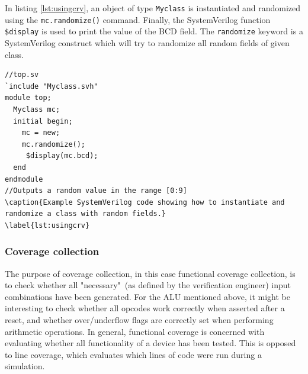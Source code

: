 \documentclass[conference]{IEEEtran}
\newcommand{\SV}{SystemVerilog\xspace}
\newcommand{\longlist}[3]{{}}
\begin{document}
\longlist{snippets/Myclass.svh}{Example SystemVerilog code showing how different values are constrained.}{lst:crvlst}


In listing \ref{lst:usingcrv}, an object of type \texttt{Myclass} is instantiated and randomized using the \texttt{mc.randomize()} command. Finally, the \SV function \texttt{\$display} is used to print the value of the BCD field. The \texttt{randomize} keyword is a \SV construct which will try to randomize all random fields of given class.

\begin{lstlisting}
//top.sv
`include "Myclass.svh"
module top;
  Myclass mc;
  initial begin;
    mc = new;
    mc.randomize();
	 $display(mc.bcd);
  end
endmodule
//Outputs a random value in the range [0:9]
\caption{Example SystemVerilog code showing how to instantiate and randomize a class with random fields.}
\label{lst:usingcrv}
\end{lstlisting}

\subsubsection{Coverage collection}
The purpose of coverage collection, in this case functional coverage collection, is to check whether all "necessary"\, (as defined by the verification engineer) input combinations have been generated. For the ALU mentioned above, it might be interesting to check whether all opcodes work correctly when asserted after a reset, and whether over/underflow flags are correctly set when performing arithmetic operations. In general, functional coverage is concerned with evaluating whether all functionality of a device has been tested. This is opposed to line coverage, which evaluates which lines of code were run during a simulation.

\longlist{snippets/Cover.svh}{Examle SystemVerilog code showing how covergrups and coverpoints are organized.}{lst:cov}

\end{document}
